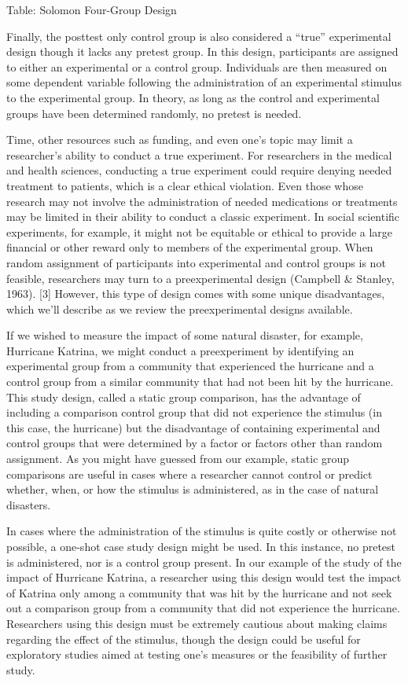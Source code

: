 Table: Solomon Four-Group Design

Finally, the posttest only control group is also considered a “true” experimental design though it lacks any pretest group. In this design, participants are assigned to either an experimental or a control group. Individuals are then measured on some dependent variable following the administration of an experimental stimulus to the experimental group. In theory, as long as the control and experimental groups have been determined randomly, no pretest is needed.

Time, other resources such as funding, and even one’s topic may limit a researcher’s ability to conduct a true experiment. For researchers in the medical and health sciences, conducting a true experiment could require denying needed treatment to patients, which is a clear ethical violation. Even those whose research may not involve the administration of needed medications or treatments may be limited in their ability to conduct a classic experiment. In social scientific experiments, for example, it might not be equitable or ethical to provide a large financial or other reward only to members of the experimental group. When random assignment of participants into experimental and control groups is not feasible, researchers may turn to a preexperimental design (Campbell \& Stanley, 1963). [3] However, this type of design comes with some unique disadvantages, which we’ll describe as we review the preexperimental designs available.

If we wished to measure the impact of some natural disaster, for example, Hurricane Katrina, we might conduct a preexperiment by identifying an experimental group from a community that experienced the hurricane and a control group from a similar community that had not been hit by the hurricane. This study design, called a static group comparison, has the advantage of including a comparison control group that did not experience the stimulus (in this case, the hurricane) but the disadvantage of containing experimental and control groups that were determined by a factor or factors other than random assignment. As you might have guessed from our example, static group comparisons are useful in cases where a researcher cannot control or predict whether, when, or how the stimulus is administered, as in the case of natural disasters.

In cases where the administration of the stimulus is quite costly or otherwise not possible, a one-shot case study design might be used. In this instance, no pretest is administered, nor is a control group present. In our example of the study of the impact of Hurricane Katrina, a researcher using this design would test the impact of Katrina only among a community that was hit by the hurricane and not seek out a comparison group from a community that did not experience the hurricane. Researchers using this design must be extremely cautious about making claims regarding the effect of the stimulus, though the design could be useful for exploratory studies aimed at testing one’s measures or the feasibility of further study.

